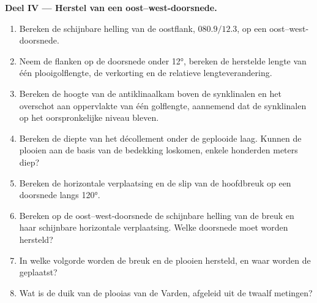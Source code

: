 \begin{problem}
\medskip\noindent\textbf{Deel IV --- Herstel van een oost--west-doorsnede.}
\begin{enumerate}[resume]
  \item Bereken de schijnbare helling van de oostflank, $080.9/12.3$, op een
        oost--west-doorsnede.
  \item Neem de flanken op de doorsnede onder \ang{12}, bereken de herstelde
        lengte van één plooigolflengte, de verkorting en de
        relatieve lengteverandering.
  \item Bereken de hoogte van de antiklinaalkam boven de synklinalen en het overschot
        aan oppervlakte van één golflengte, aannemend dat de synklinalen op het
        oorspronkelijke niveau bleven.
  \item Bereken de diepte van het décollement onder de geplooide laag. Kunnen de
        plooien aan de basis van de bedekking loskomen, enkele honderden meters
        diep?
  \item Bereken de horizontale verplaatsing en de slip van de hoofdbreuk op een
        doorsnede langs \ang{120}.
  \item Bereken op de oost--west-doorsnede de schijnbare helling van de breuk en
        haar schijnbare horizontale verplaatsing. Welke doorsnede moet worden hersteld?
  \item In welke volgorde worden de breuk en de plooien hersteld, en waar worden de
         geplaatst?
  \item Wat is de duik van de plooias van de Varden, afgeleid uit de twaalf
        metingen?
\end{enumerate}
\end{problem}
